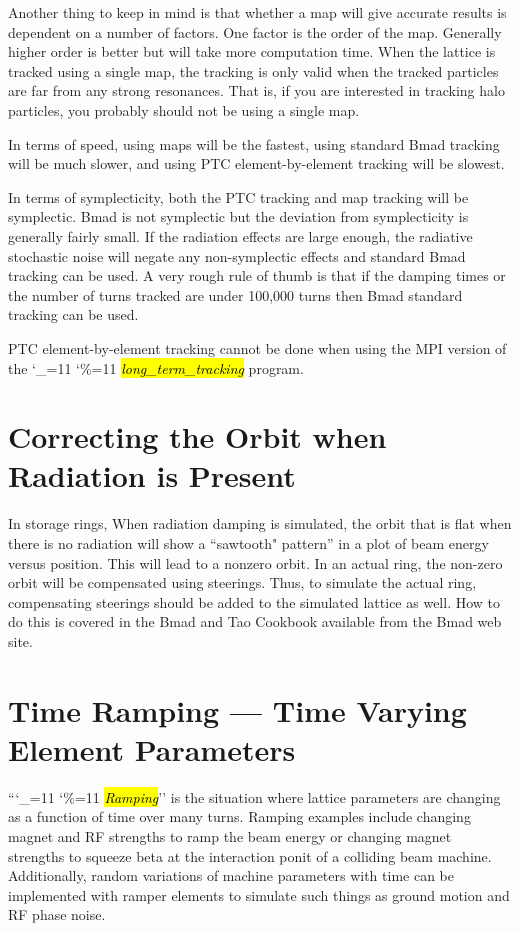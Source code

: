 \documentclass{hitec}
\newcommand\dottcmd[1]{\hl{\em#1}\endgroup}
\newcommand{\vn}{\begingroup\catcode`\_=11 \catcode`\%=11 \dottcmd}
\newcommand{\ltt}{\vn{long_term_tracking}\xspace}
\newcommand{\Section}[1]{\section{#1}\vspace*{-1ex}}
\begin{document}
{{{{{{{{{{{{Another thing to keep in mind is that whether a map will give accurate results is dependent on a
number of factors. One factor is the order of the map. Generally higher order is better but will
take more computation time. When the lattice is tracked using a single map, the tracking is only
valid when the tracked particles are far from any strong resonances. That is, if you are interested
in tracking halo particles, you probably should not be using a single map.

In terms of speed, using maps will be the fastest, using standard Bmad tracking will be much
slower, and using PTC element-by-element tracking will be slowest.

In terms of symplecticity, both the PTC tracking and map tracking will be symplectic.
Bmad is not symplectic but the deviation from symplecticity is generally fairly small. If the
radiation effects are large enough, the radiative stochastic noise will negate any non-symplectic
effects and standard Bmad tracking can be used. A very rough rule of thumb is that if the damping times
or the number of turns tracked are under 100,000 turns then Bmad standard tracking can be used.

PTC element-by-element tracking cannot be done when using the MPI version of the \ltt program.

\Section{Correcting the Orbit when Radiation is Present}

In storage rings, When radiation damping is simulated, the orbit that is flat when there is no
radiation will show a ``sawtooth" pattern'' in a plot of beam energy versus position. This will lead
to a nonzero orbit. In an actual ring, the non-zero orbit will be compensated using steerings. Thus,
to simulate the actual ring, compensating steerings should be added to the simulated lattice as
well. How to do this is covered in the Bmad and Tao Cookbook available from the Bmad web site.

\Section{Time Ramping --- Time Varying Element Parameters}
\label{s:ramp}

``\vn{Ramping}'' is the situation where lattice parameters are changing as a function of time over
many turns. Ramping examples include changing magnet and RF strengths to ramp the beam energy or
changing magnet strengths to squeeze beta at the interaction ponit of a colliding beam
machine. Additionally, random variations of machine parameters with time can be implemented with
ramper elements to simulate such things as ground motion and RF phase noise.

}}}}}}}}}}}}
\end{document}
